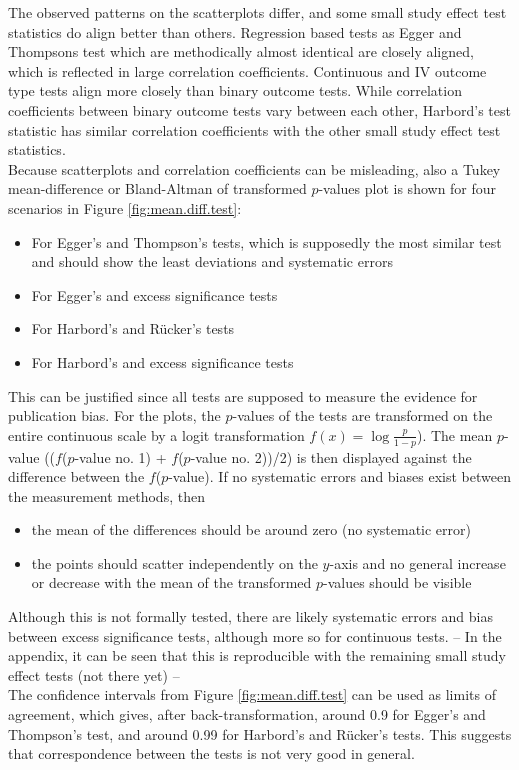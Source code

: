 \documentclass[11pt,a4paper,twoside]{book}\usepackage[]{graphicx}\usepackage[]{color}
\begin{document}
The observed patterns on the scatterplots differ, and some small study effect test statistics do align better than others. Regression based tests as Egger and Thompsons test which are methodically almost identical are closely aligned, which is reflected in large correlation coefficients. Continuous and IV outcome type tests align more closely than binary outcome tests. While correlation coefficients between binary outcome tests vary between each other, Harbord's test statistic has similar correlation coefficients with the other small study effect test statistics.\\
Because scatterplots and correlation coefficients can be misleading, also a Tukey mean-difference or Bland-Altman of transformed $p$-values plot is shown for four scenarios in Figure \ref{fig:mean.diff.test}:
\begin{itemize}
\item For Egger's and Thompson's tests, which is supposedly the most similar test and should show the least deviations and systematic errors
\item For Egger's and excess significance tests
\item For Harbord's and R\"ucker's tests
\item For Harbord's and excess significance tests
\end{itemize}

This can be justified since all tests are supposed to measure the evidence for publication bias. For the plots, the $p$-values of the tests are transformed on the entire continuous scale by a logit transformation $f(x)  = \log\frac{p}{1-p}$). The mean $p$-value (($f$($p$-value no. 1) + $f$($p$-value no. 2))/2) is then displayed against the difference between the $f$($p$-value). If no systematic errors and biases exist between the measurement methods, then 

\begin{itemize}
\item the mean of the differences should be around zero (no systematic error) 
\item the points should scatter independently on the $y$-axis and no general increase or decrease with the mean of the transformed $p$-values should be visible
\end{itemize}

Although this is not formally tested, there are likely systematic errors and bias between excess significance tests, although more so for continuous tests. -- In the appendix, it can be seen that this is reproducible with the remaining small study effect tests (not there yet) -- \\
The confidence intervals from Figure \ref{fig:mean.diff.test} can be used as limits of agreement, which gives, after back-transformation, around 0.9 for Egger's and Thompson's test, and around 0.99 for Harbord's and R\"ucker's tests. This suggests that correspondence between the tests is not very good in general. 
\end{document}

